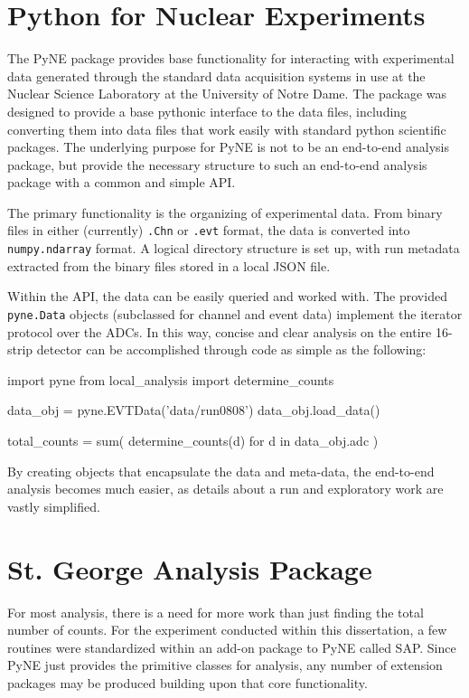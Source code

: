 \section{Python for Nuclear Experiments}

The PyNE package provides base functionality for interacting with
experimental data generated through the standard data acquisition
systems in use at the Nuclear Science Laboratory at the University of
Notre Dame. The package was designed to provide a base pythonic
interface to the data files, including converting them into data files
that work easily with standard python scientific packages. The
underlying purpose for PyNE is not to be an end-to-end analysis package,
but provide the necessary structure to such an end-to-end analysis
package with a common and simple API.

The primary functionality is the organizing of experimental data. From
binary files in either (currently) \verb+.Chn+ or \verb+.evt+ format,
the data is converted into \verb+numpy.ndarray+ format. A logical
directory structure is set up, with run metadata extracted from the
binary files stored in a local JSON file.

Within the API, the data can be easily queried and worked with. The
provided \verb+pyne.Data+ objects (subclassed for channel and event
data) implement the iterator protocol over the ADCs. In this way,
concise and clear analysis on the entire 16-strip detector can be
accomplished through code as simple as the following:

\newpage
\begin{python}
import pyne
from local_analysis import determine_counts

data_obj = pyne.EVTData('data/run0808')
data_obj.load_data()

total_counts = sum(
    determine_counts(d) for d in data_obj.adc
)
\end{python}

By creating objects that encapsulate the data and meta-data, the
end-to-end analysis becomes much easier, as details about a run and
exploratory work are vastly simplified.

\section{St. George Analysis Package}

For most analysis, there is a need for more work than just finding the
total number of counts. For the experiment conducted within this
dissertation, a few routines were standardized within an add-on package
to PyNE called SAP. Since PyNE just provides the primitive
classes for analysis, any number of extension packages may be produced
building upon that core functionality.


